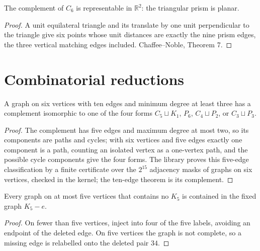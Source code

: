 \begin{lemma}
  \label{lem:prism}
  \leanok
  The complement of $C_6$ is representable in $\mathbb{R}^2$: the triangular prism is planar.
\end{lemma}
\begin{proof}
  A unit equilateral triangle and its translate by one unit perpendicular to the triangle
  give six points whose unit distances are exactly the nine prism edges, the three vertical
  matching edges included. Chaffee--Noble, Theorem 7.
\end{proof}

\section{Combinatorial reductions}

\begin{lemma}
  \label{lem:classification}
  \leanok
  A graph on six vertices with ten edges and minimum degree at least three has a complement
  isomorphic to one of the four forms $C_5 \sqcup K_1$, $P_6$, $C_4 \sqcup P_2$, or
  $C_3 \sqcup P_3$.
\end{lemma}
\begin{proof}
  The complement has five edges and maximum degree at most two, so its components are paths
  and cycles; with six vertices and five edges exactly one component is a path, counting an
  isolated vertex as a one-vertex path, and the possible cycle components give the four
  forms. The library proves this five-edge classification by a finite certificate over the
  $2^{15}$ adjacency masks of graphs on six vertices, checked in the kernel; the ten-edge
  theorem is its complement.
\end{proof}

\begin{lemma}
  \label{lem:five}
  \leanok
  Every graph on at most five vertices that contains no $K_5$ is contained in the fixed graph
  $K_5 - e$.
\end{lemma}
\begin{proof}
  On fewer than five vertices, inject into four of the five labels, avoiding an endpoint of
  the deleted edge. On five vertices the graph is not complete, so a missing edge is
  relabelled onto the deleted pair $34$.
\end{proof}


